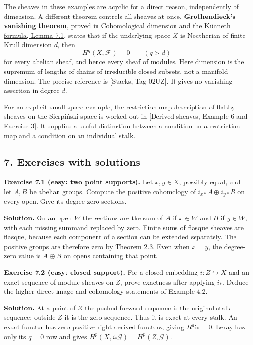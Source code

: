 \documentclass[11pt]{article}
\begin{document}
The sheaves in these examples are acyclic for a direct reason,
independently of dimension. A different theorem controls all sheaves at
once. \textbf{Grothendieck's vanishing theorem}, proved in
\href{https://kokunoyumeto.github.io/open-math-courses/courses/ag-etale-cohomology/cohomological-dimension-and-the-kunneth-formula.html\#7-the-bound-for-all-finite-type-schemes}{Cohomological
dimension and the Künneth formula, Lemma 7.1}, states that if the
underlying space \(X\) is Noetherian of finite Krull dimension \(d\),
then \[
H^q(X,\mathcal F)=0\qquad(q>d)
\] for every abelian sheaf, and hence every sheaf of modules. Here
dimension is the supremum of lengths of chains of irreducible closed
subsets, not a manifold dimension. The precise reference is {[}Stacks,
Tag 02UZ{]}. It gives no vanishing assertion in degree \(d\).

For an explicit small-space example, the restriction-map description of
flabby sheaves on the Sierpiński space is worked out in {[}Derived
sheaves, Example 6 and Exercise 3{]}. It supplies a useful distinction
between a condition on a restriction map and a condition on an
individual stalk.

\subsection{7. Exercises with solutions}\label{exercises-with-solutions}

\textbf{Exercise 7.1 (easy: two point supports).} Let \(x,y\in X\),
possibly equal, and let \(A,B\) be abelian groups. Compute the positive
cohomology of \(i_{x*}A\oplus i_{y*}B\) on every open. Give its
degree-zero sections.

\textbf{Solution.} On an open \(W\) the sections are the sum of \(A\) if
\(x\in W\) and \(B\) if \(y\in W\), with each missing summand replaced
by zero. Finite sums of flasque sheaves are flasque, because each
component of a section can be extended separately. The positive groups
are therefore zero by Theorem 2.3. Even when \(x=y\), the degree-zero
value is \(A\oplus B\) on opens containing that point.

\textbf{Exercise 7.2 (easy: closed support).} For a closed embedding
\(i:Z\hookrightarrow X\) and an exact sequence of module sheaves on
\(Z\), prove exactness after applying \(i_*\). Deduce the
higher-direct-image and cohomology statements of Example 4.2.

\textbf{Solution.} At a point of \(Z\) the pushed-forward sequence is
the original stalk sequence; outside \(Z\) it is the zero sequence. Thus
it is exact at every stalk. An exact functor has zero positive right
derived functors, giving \(R^qi_*=0\). Leray has only its \(q=0\) row
and gives \(H^p(X,i_*\mathcal G)=H^p(Z,\mathcal G)\).
\end{document}
